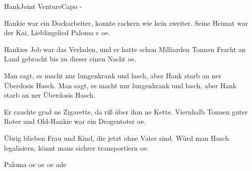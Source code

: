 \begin{song}{Hank}{Joint Venture}{Capo -}

Hankie war ein Dockarbeiter, konnte rackern wie kein zweiter.
Seine Heimat war der Kai, Lieblingslied Paloma e oe.

Hankies Job war das Verladen, und er hatte schon Milliarden
Tonnen Fracht an Land gebracht bis zu dieser einen Nacht oe.

Man sagt, es macht nur lungenkrank und lasch,
aber Hank starb an ner Überdosis Hasch.
Man sagt, es macht nur lungenkrank und lasch,
aber Hank starb an ner Überdosis Hasch.

Er rauchte grad ne Zigarette, da riß über ihm ne Kette.
Viernhalb Tonnen guter Roter und Old-Hankie war ein Drogentoter oe.


Übrig blieben Frau und Kind, die jetzt ohne Vater sind.
Würd man Hasch legalisiern, könnt mans sichrer transportiern oe.


Paloma oe oe oe ade
\end{song}
